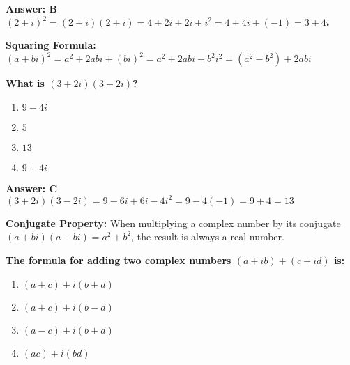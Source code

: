 \documentclass[12pt,a4paper]{article}
\begin{document}
\begin{answerstyle}
\textbf{Answer: B} \\
\( (2 + i)^2 = (2 + i)(2 + i) = 4 + 2i + 2i + i^2 = 4 + 4i + (-1) = 3 + 4i \)
\end{answerstyle}

\begin{conceptbox}
\textbf{Squaring Formula:} \( (a + bi)^2 = a^2 + 2abi + (bi)^2 = a^2 + 2abi + b^2i^2 = (a^2 - b^2) + 2abi \)
\end{conceptbox}

\newpage
\begin{questiontitle}[MCQ 40]
\textbf{What is \( (3 + 2i)(3 - 2i) \)?}
\end{questiontitle}

\begin{partbox}[Options]
\begin{enumerate}[label=\Alph*.]
    \item \( 9 - 4i \)
    \item \( 5 \)
    \item \( 13 \)
    \item \( 9 + 4i \)
\end{enumerate}
\end{partbox}

\begin{answerstyle}
\textbf{Answer: C} \\
\( (3 + 2i)(3 - 2i) = 9 - 6i + 6i - 4i^2 = 9 - 4(-1) = 9 + 4 = 13 \)
\end{answerstyle}

\begin{conceptbox}
\textbf{Conjugate Property:} When multiplying a complex number by its conjugate \( (a + bi)(a - bi) = a^2 + b^2 \), the result is always a real number.
\end{conceptbox}

\newpage
\begin{questiontitle}[MCQ 41]
\textbf{The formula for adding two complex numbers \( (a + ib) + (c + id) \) is:}
\end{questiontitle}

\begin{partbox}[Options]
\begin{enumerate}[label=\Alph*.]
    \item \( (a + c) + i(b + d) \)
    \item \( (a + c) + i(b - d) \)
    \item \( (a - c) + i(b + d) \)
    \item \( (ac) + i(bd) \)
\end{enumerate}
\end{partbox}
\end{document}
